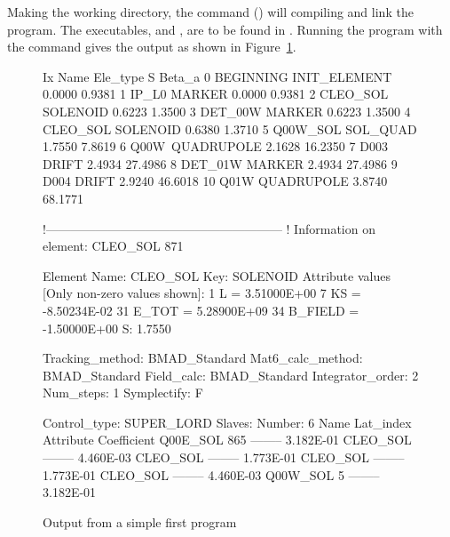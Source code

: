Making  the working directory, the 
command () will compiling and link the program.  The
executables,  and , are to be
found in . Running the program with the command
 gives the output as shown in
Figure~\ref{f:output}.

\begin{figure}[ht]
\begin{listing}{1}
  Ix  Name              Ele_type                   S      Beta_a
   0  BEGINNING         INIT_ELEMENT          0.0000      0.9381
   1  IP_L0             MARKER                0.0000      0.9381
   2  CLEO_SOL\3        SOLENOID              0.6223      1.3500
   3  DET_00W           MARKER                0.6223      1.3500
   4  CLEO_SOL\4        SOLENOID              0.6380      1.3710
   5  Q00W\CLEO_SOL     SOL_QUAD              1.7550      7.8619
   6  Q00W\             QUADRUPOLE            2.1628     16.2350
   7  D003              DRIFT                 2.4934     27.4986
   8  DET_01W           MARKER                2.4934     27.4986
   9  D004              DRIFT                 2.9240     46.6018
  10  Q01W              QUADRUPOLE            3.8740     68.1771

 !---------------------------------------------------------
 ! Information on element: CLEO_SOL 871

  Element Name: CLEO_SOL
  Key: SOLENOID
  Attribute values [Only non-zero values shown]:
      1   L                =  3.51000E+00
      7   KS               = -8.50234E-02
     31   E_TOT      =  5.28900E+09
     34   B_FIELD          = -1.50000E+00
  S:       1.7550

  Tracking_method:  BMAD_Standard
  Mat6_calc_method: BMAD_Standard
  Field_calc:       BMAD_Standard
  Integrator_order:   2
  Num_steps:          1
  Symplectify:        F

  Control_type: SUPER_LORD
  Slaves: Number:   6
      Name             Lat_index  Attribute       Coefficient
      Q00E\CLEO_SOL          865  --------          3.182E-01
      CLEO_SOL  --------          4.460E-03
      CLEO_SOL  --------          1.773E-01
      CLEO_SOL  --------          1.773E-01
      CLEO_SOL  --------          4.460E-03
      Q00W\CLEO_SOL            5  --------          3.182E-01
\end{listing}
\caption{Output from a simple first program}
\label{f:output}
\end{figure}

